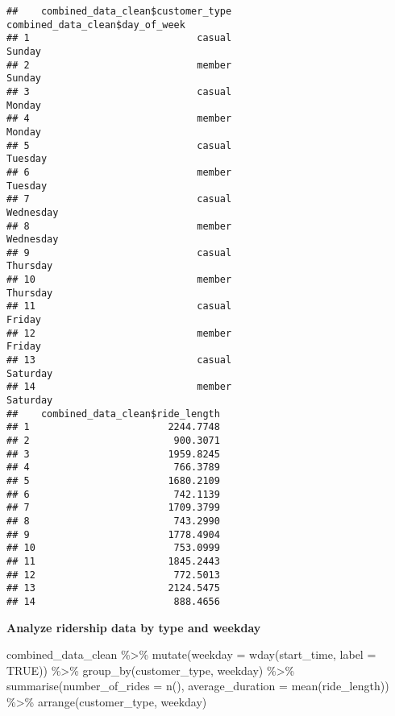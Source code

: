 \documentclass[
]{article}
\newenvironment{Shaded}{\begin{snugshade}}{\end{snugshade}}
\newcommand{\AttributeTok}[1]{\textcolor[rgb]{0.77,0.63,0.00}{#1}}
\newcommand{\ConstantTok}[1]{\textcolor[rgb]{0.00,0.00,0.00}{#1}}
\newcommand{\FunctionTok}[1]{\textcolor[rgb]{0.00,0.00,0.00}{#1}}
\newcommand{\NormalTok}[1]{#1}
\newcommand{\SpecialCharTok}[1]{\textcolor[rgb]{0.00,0.00,0.00}{#1}}
\begin{document}
\begin{verbatim}
##    combined_data_clean$customer_type combined_data_clean$day_of_week
## 1                             casual                          Sunday
## 2                             member                          Sunday
## 3                             casual                          Monday
## 4                             member                          Monday
## 5                             casual                         Tuesday
## 6                             member                         Tuesday
## 7                             casual                       Wednesday
## 8                             member                       Wednesday
## 9                             casual                        Thursday
## 10                            member                        Thursday
## 11                            casual                          Friday
## 12                            member                          Friday
## 13                            casual                        Saturday
## 14                            member                        Saturday
##    combined_data_clean$ride_length
## 1                        2244.7748
## 2                         900.3071
## 3                        1959.8245
## 4                         766.3789
## 5                        1680.2109
## 6                         742.1139
## 7                        1709.3799
## 8                         743.2990
## 9                        1778.4904
## 10                        753.0999
## 11                       1845.2443
## 12                        772.5013
## 13                       2124.5475
## 14                        888.4656
\end{verbatim}

\textbf{Analyze ridership data by type and weekday}

\begin{Shaded}
\begin{Highlighting}[]
\NormalTok{combined\_data\_clean }\SpecialCharTok{\%\textgreater{}\%} 
  \FunctionTok{mutate}\NormalTok{(}\AttributeTok{weekday =} \FunctionTok{wday}\NormalTok{(start\_time, }\AttributeTok{label =} \ConstantTok{TRUE}\NormalTok{)) }\SpecialCharTok{\%\textgreater{}\%}  
  \FunctionTok{group\_by}\NormalTok{(customer\_type, weekday) }\SpecialCharTok{\%\textgreater{}\%}  
  \FunctionTok{summarise}\NormalTok{(}\AttributeTok{number\_of\_rides =} \FunctionTok{n}\NormalTok{(), }\AttributeTok{average\_duration =} \FunctionTok{mean}\NormalTok{(ride\_length)) }\SpecialCharTok{\%\textgreater{}\%} 
  \FunctionTok{arrange}\NormalTok{(customer\_type, weekday)}
\end{Highlighting}
\end{Shaded}
\end{document}
